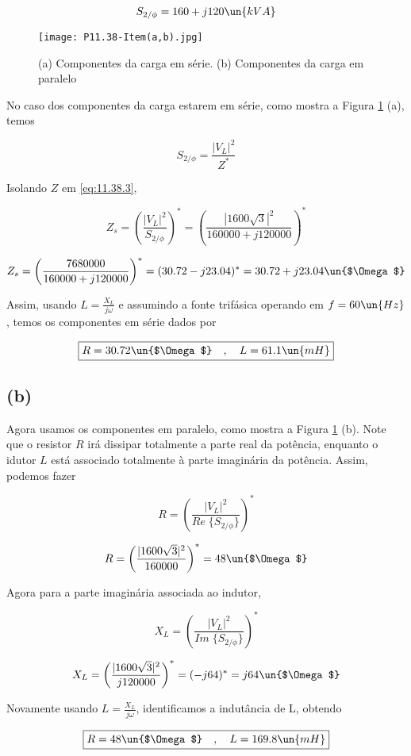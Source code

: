 \[ S_{2/\phi} = 160 + j120 \un{kVA} \]

\begin{figure}[hb]
    \centering
    \caption{(a) Componentes da carga em série. (b) Componentes da carga em paralelo}
      \centering
      \texttt{[image: P11.38-Item(a,b).jpg]} \\
    \label{fig:11.38.1}
\end{figure}

No caso dos componentes da carga estarem em série, como mostra a Figura \ref*{fig:11.38.1} (a), temos 

\begin{equation}\label{eq:11.38.3}
    S_{2/\phi} = \frac{ |V_L|^2}{Z^*}
\end{equation}

Isolando $Z$ em \eqref{eq:11.38.3},  

\[ Z_s = \left(\frac{ |V_L|^2}{ S_{2/\phi} }\right)^* = \left(\frac{ |1600\sqrt{3}|^2}{ 160000 + j120000 }\right)^*  \]

\[ Z_s = \left(\frac{7680000}{ 160000 + j120000 }\right)^* = (30.72 - j23.04)^* = 30.72 + j23.04 \un{$\Omega$} \]

Assim, usando $L = \frac{X_L}{j\omega}$ e assumindo a fonte trifásica operando em $f =60 \un{Hz}$, temos os componentes em série dados por

\[ \boxed{R = 30.72 \un{$\Omega$} \quad , \quad L = 61.1 \un{mH} } \]

\subsection*{(b)}

Agora usamos os componentes em paralelo, como mostra a Figura \ref*{fig:11.38.1} (b). Note que o resistor $R$ irá dissipar totalmente
a parte real da potência, enquanto o idutor $L$ está associado totalmente à parte imaginária da potência. Assim, podemos fazer  

\[ R = \left(\frac{ |V_L|^2}{ Re\;\{S_{2/\phi}\}  }\right)^* \]

\[ R = \left(\frac{ |1600\sqrt{3}|^2}{ 160000  }\right)^* = 48 \un{$\Omega$} \]

Agora para a parte imaginária associada ao indutor, 

\[ X_L = \left(\frac{ |V_L|^2}{ Im\;\{S_{2/\phi}\}  }\right)^* \]

\[ X_L = \left(\frac{ |1600\sqrt{3}|^2}{ j120000  }\right)^* =(-j 64)^* = j64 \un{$\Omega$} \]

Novamente usando $L = \frac{X_L}{j\omega}$, identificamos a indutância de L, obtendo

\[ \boxed{R = 48 \un{$\Omega$} \quad , \quad L = 169.8 \un{mH} } \]


